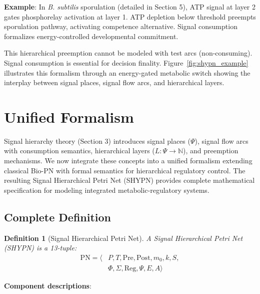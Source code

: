 \documentclass[twocolumn,11pt]{article}
\newtheorem{definition}{Definition}
\begin{document}
\vspace{3pt}
\noindent\textbf{Example}: In \textit{B. subtilis} sporulation (detailed in Section 5), ATP signal at layer 2 gates phosphorelay activation at layer 1. ATP depletion below threshold preempts sporulation pathway, activating competence alternative. Signal consumption formalizes energy-controlled developmental commitment.

\vspace{3pt}
\noindent This hierarchical preemption cannot be modeled with test arcs (non-consuming). Signal consumption is essential for decision finality. Figure~\ref{fig:shypn_example} illustrates this formalism through an energy-gated metabolic switch showing the interplay between signal places, signal flow arcs, and hierarchical layers.

\section{Unified Formalism}

Signal hierarchy theory (Section 3) introduces signal places ($\Psi$), signal flow arcs with consumption semantics, hierarchical layers ($L: \Psi \to \mathbb{N}$), and preemption mechanisms. We now integrate these concepts into a unified formalism extending classical Bio-PN with formal semantics for hierarchical regulatory control. The resulting Signal Hierarchical Petri Net (SHYPN) provides complete mathematical specification for modeling integrated metabolic-regulatory systems.

\subsection{Complete Definition}

\begin{definition}[Signal Hierarchical Petri Net]
A Signal Hierarchical Petri Net (SHYPN) is a 13-tuple:
\begin{align*}
\text{PN} = \langle &P, T, \text{Pre}, \text{Post}, m_0, k, S, \\
&\Phi, \Sigma, \text{Reg}, \Psi, E, A \rangle
\end{align*}
\end{definition}

\textbf{Component descriptions}:
\end{document}

